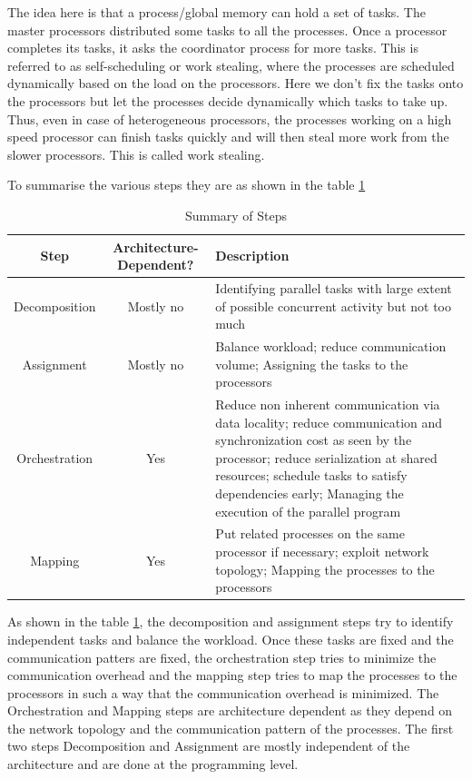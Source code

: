 \documentclass[12pt]{article}
\begin{document}
The idea here is that a process/global memory can hold a set of tasks. The master processors distributed some tasks to all the processes. Once a processor completes its tasks, it asks the coordinator process for more tasks.
This is referred to as self-scheduling or work stealing, where the processes are scheduled dynamically based on the load on the processors. Here we don't fix the tasks onto the processors but let the processes decide dynamically which tasks to take up.
Thus, even in case of heterogeneous processors, the processes working on a high speed processor can finish tasks quickly and will then steal more work from the slower processors. This is called work stealing.


To summarise the various steps they are as shown in the table \ref{tab:summary}
\begin{table}[H]
    \centering
    \begin{tabular}{|c|c|p{}|}
        \hline
        \textbf{Step} & Architecture-Dependent? &  \textbf{Description} \\
        \hline
        Decomposition & Mostly no &  Identifying parallel tasks with large extent of possible concurrent activity but not too much \\
        Assignment & Mostly no & Balance workload; reduce communication volume; Assigning the tasks to the processors \\
        Orchestration & Yes & Reduce non inherent communication via data locality; reduce communication and synchronization cost as seen by the processor; reduce serialization at shared resources; schedule tasks to satisfy dependencies early;
        Managing the execution of the parallel program \\
        Mapping & Yes & Put related processes on the same processor if necessary; exploit network topology; Mapping the processes to the processors \\
        \hline
    \end{tabular}
    \caption{Summary of Steps}
    \label{tab:summary}
\end{table}
As shown in the table \ref{tab:summary}, the decomposition and assignment steps try to identify independent tasks and balance the workload. Once these tasks are fixed and the communication patters are fixed,
the orchestration step tries to minimize the communication overhead and the mapping step tries to map the processes to the processors in such a way that the communication overhead is minimized. The Orchestration and Mapping steps are architecture dependent as they depend on the network topology and the communication pattern of the processes.
The first two steps Decomposition and Assignment are mostly independent of the architecture and are done at the programming level.
\end{document}
